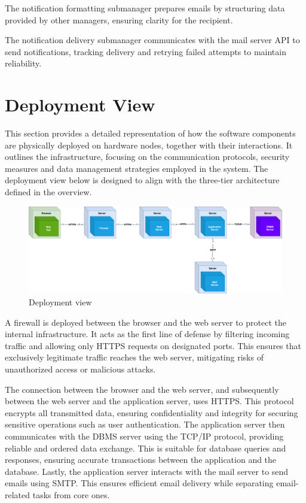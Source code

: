 The notification formatting submanager prepares emails by structuring data provided by other managers, ensuring clarity for the recipient.

The notification delivery submanager communicates with the mail server API to send notifications, tracking delivery and retrying failed attempts to maintain reliability.

\section{Deployment View}
This section provides a detailed representation of how the software components are physically deployed on hardware nodes, together with their interactions.
It outlines the infrastructure, focusing on the communication protocols, security measures and data management strategies employed in the system.
The deployment view below is designed to align with the three-tier architecture defined in the overview.

\begin{figure}[ht]
    \centering
    \includegraphics[width=16cm]{images/deployment-view.png}
    \caption{Deployment view}
\end{figure}

A firewall is deployed between the browser and the web server to protect the internal infrastructure.
It acts as the first line of defense by filtering incoming traffic and allowing only HTTPS requests on designated ports.
This ensures that exclusively legitimate traffic reaches the web server, mitigating risks of unauthorized access or malicious attacks.

The connection between the browser and the web server, and subsequently between the web server and the application server, uses HTTPS.
This protocol encrypts all transmitted data, ensuring confidentiality and integrity for securing sensitive operations such as user authentication.
The application server then communicates with the DBMS server using the TCP/IP protocol, providing reliable and ordered data exchange.
This is suitable for database queries and responses, ensuring accurate transactions between the application and the database.
Lastly, the application server interacts with the mail server to send emails using SMTP.
This ensures efficient email delivery while separating email-related tasks from core ones.

